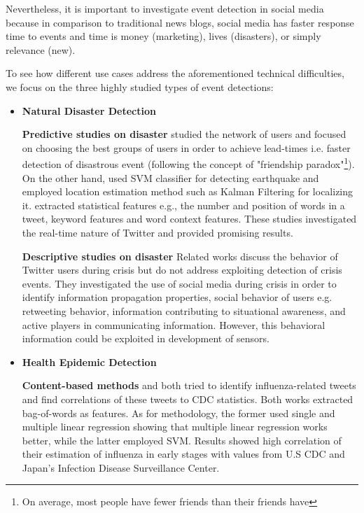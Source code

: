 \documentclass{acm_proc_article-sp}
\begin{document}
Nevertheless, it is important to investigate event detection in social media because in comparison to traditional news blogs, social media has faster response time to events and time is money (marketing), lives (disasters), or simply relevance (new).

To see how different use cases address the aforementioned technical difficulties, we focus on the three highly studied types of event detections:
\begin{itemize}
\item \textbf{Natural Disaster Detection}

\textbf{Predictive studies on disaster} \label{FP} \cite{sandy} studied the network of users and focused on choosing the best groups of users in order to achieve lead-times i.e. faster detection of disastrous event (following the concept of "friendship paradox"\footnote{On average, most people have fewer friends than their friends have}). On the other hand, \cite{sakakiEq2} used SVM classifier for detecting earthquake and employed location estimation method such as Kalman Filtering for localizing it. \cite{sakakiEq2} extracted statistical features e.g., the number and position of words in a tweet, keyword features and word context features. These studies investigated the real-time nature of Twitter and provided promising results.

\textbf{Descriptive studies on disaster} Related works discuss the behavior of Twitter users during crisis \cite{vieweg, cheong, starbird} but do not address exploiting detection of crisis events. They investigated the use of social media during crisis in order to identify information propagation properties, social behavior of users e.g. retweeting behavior, information contributing to situational awareness, and active players in communicating information. However, this behavioral information could be exploited in development of sensors.

\item \textbf{Health Epidemic Detection}

\textbf{Content-based methods} \cite{culotta} and \cite{aramaki} both tried to identify influenza-related tweets and find correlations of these tweets to CDC statistics.  Both works extracted bag-of-words as features. As for methodology, the former used single and multiple linear regression showing that multiple linear regression works better, while the latter employed SVM. Results showed high correlation of their estimation of influenza in early stages with values from U.S CDC and Japan's Infection Disease Surveillance Center.


\end{itemize}
\end{document}

